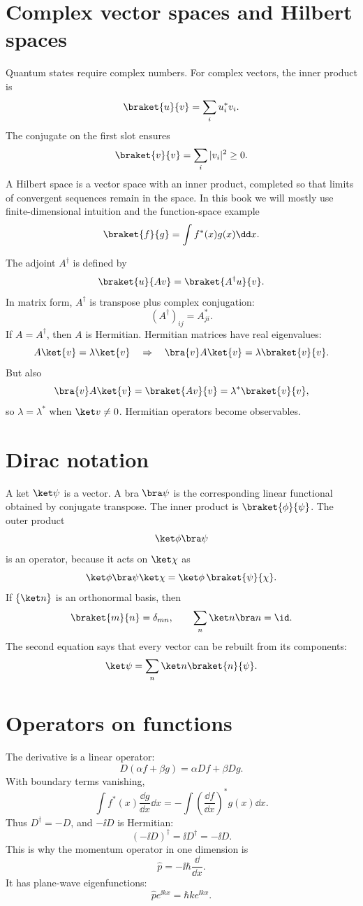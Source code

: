\section{Complex vector spaces and Hilbert spaces}

Quantum states require complex numbers.  For complex vectors, the inner product is
\[
  \braket{u}{v}=\sum_i u_i^*v_i.
\]
The conjugate on the first slot ensures
\[
  \braket{v}{v}=\sum_i |v_i|^2\ge0.
\]
A Hilbert space is a vector space with an inner product, completed so that limits of convergent sequences remain in the space.  In this book we will mostly use finite-dimensional intuition and the function-space example
\[
  \braket{f}{g}=\int f^*(x)g(x)\dd x.
\]

The adjoint \(A^\dagger\) is defined by
\[
  \braket{u}{Av}=\braket{A^\dagger u}{v}.
\]
In matrix form, \(A^\dagger\) is transpose plus complex conjugation:
\[
  (A^\dagger)_{ij}=A_{ji}^*.
\]
If \(A=A^\dagger\), then \(A\) is Hermitian.  Hermitian matrices have real eigenvalues:
\[
  A\ket{v}=\lambda\ket{v}
  \quad\Rightarrow\quad
  \bra{v}A\ket{v}=\lambda\braket{v}{v}.
\]
But also
\[
  \bra{v}A\ket{v}=\braket{Av}{v}=\lambda^*\braket{v}{v},
\]
so \(\lambda=\lambda^*\) when \(\ket v\ne0\).  Hermitian operators become observables.

\section{Dirac notation}

A ket \(\ket\psi\) is a vector.  A bra \(\bra\psi\) is the corresponding linear functional obtained by conjugate transpose.  The inner product is \(\braket{\phi}{\psi}\).  The outer product
\[
  \ket\phi\bra\psi
\]
is an operator, because it acts on \(\ket\chi\) as
\[
  \ket\phi\bra\psi\ket\chi
  =
  \ket\phi\,\braket{\psi}{\chi}.
\]
If \(\{\ket n\}\) is an orthonormal basis, then
\[
  \braket{m}{n}=\delta_{mn},
  \qquad
  \sum_n\ket n\bra n=\id.
\]
The second equation says that every vector can be rebuilt from its components:
\[
  \ket\psi=\sum_n\ket n\braket{n}{\psi}.
\]

\section{Operators on functions}

The derivative is a linear operator:
\[
  D(\alpha f+\beta g)=\alpha Df+\beta Dg.
\]
With boundary terms vanishing,
\[
  \int f^*(x)\frac{\dd g}{\dd x}\dd x
  =
  -\int \left(\frac{\dd f}{\dd x}\right)^*g(x)\dd x.
\]
Thus \(D^\dagger=-D\), and \(-\ii D\) is Hermitian:
\[
  (-\ii D)^\dagger=\ii D^\dagger=-\ii D.
\]
This is why the momentum operator in one dimension is
\[
  \hat p=-\ii\hbar\frac{\dd}{\dd x}.
\]
It has plane-wave eigenfunctions:
\[
  \hat p e^{\ii kx}=\hbar k e^{\ii kx}.
\]

